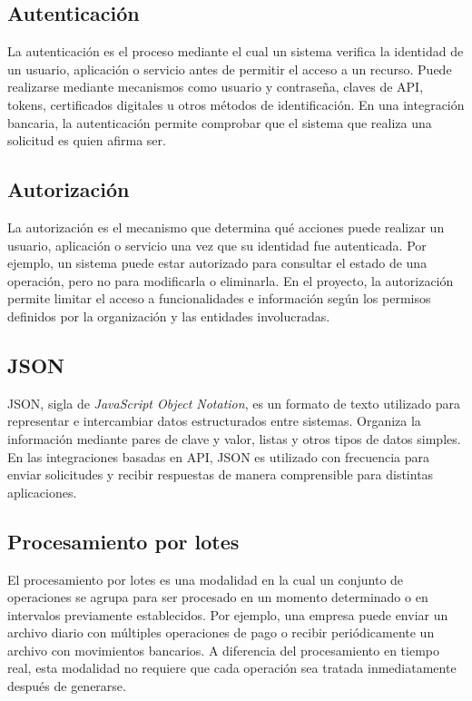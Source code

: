 \subsection{Autenticación}

La autenticación es el proceso mediante el cual un sistema verifica la identidad de un usuario, aplicación o servicio antes de permitir el acceso a un recurso. Puede realizarse mediante mecanismos como usuario y contraseña, claves de API, tokens, certificados digitales u otros métodos de identificación. En una integración bancaria, la autenticación permite comprobar que el sistema que realiza una solicitud es quien afirma ser.

\subsection{Autorización}

La autorización es el mecanismo que determina qué acciones puede realizar un usuario, aplicación o servicio una vez que su identidad fue autenticada. Por ejemplo, un sistema puede estar autorizado para consultar el estado de una operación, pero no para modificarla o eliminarla. En el proyecto, la autorización permite limitar el acceso a funcionalidades e información según los permisos definidos por la organización y las entidades involucradas.

\subsection{JSON}

JSON, sigla de \emph{JavaScript Object Notation}, es un formato de texto utilizado para representar e intercambiar datos estructurados entre sistemas. Organiza la información mediante pares de clave y valor, listas y otros tipos de datos simples. En las integraciones basadas en API, JSON es utilizado con frecuencia para enviar solicitudes y recibir respuestas de manera comprensible para distintas aplicaciones.

\subsection{Procesamiento por lotes}

El procesamiento por lotes es una modalidad en la cual un conjunto de operaciones se agrupa para ser procesado en un momento determinado o en intervalos previamente establecidos. Por ejemplo, una empresa puede enviar un archivo diario con múltiples operaciones de pago o recibir periódicamente un archivo con movimientos bancarios. A diferencia del procesamiento en tiempo real, esta modalidad no requiere que cada operación sea tratada inmediatamente después de generarse.
